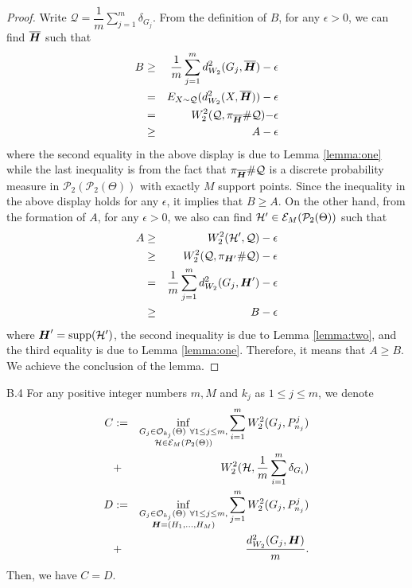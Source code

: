 \begin{proof}
Write $\mathcal{Q}=\dfrac{1}{m}\mathop {\sum }\limits_{j=1}^{m}{\delta_{G_{j}}}$. From the definition of $B$, for any $\epsilon>0$, we can find $\overline{\boldsymbol{H}}$ such that 
\begin{eqnarray}
B & \geq & \dfrac{1}{m}\sum \limits_{j=1}^{m} d_{W_{2}}^{2}(G_{j},\overline{\boldsymbol{H}}) - \epsilon \nonumber \\
& = & E_{X \sim \mathcal{Q}}(d_{W_{2}}^{2}(X,\overline{\boldsymbol{H}})) - \epsilon \nonumber \\
& = & W_{2}^{2}(\mathcal{Q},\pi_{\overline{\boldsymbol{H}}} \# \mathcal{Q}) {\bf - \epsilon} \nonumber \\
& \geq & A -\epsilon \nonumber
\end{eqnarray}
where the second equality in the above display
is due to Lemma \ref{lemma:one} while the last 
inequality is from the fact that $\pi_{\overline{\boldsymbol{H}}} \# \mathcal{Q}$ is a discrete probability measure in $\mathcal{P}_{2}(\mathcal{P}_{2}(\Theta))$ with exactly $M$ support points. Since the inequality in the above display holds for any $\epsilon$, it implies that $B \geq A$. On the other hand, from the formation of $A$, for any $\epsilon>0$, we also can find $\mathcal{H}' \in \mathcal{E}_{M}(\mathcal{P}_{2}(\Theta))$ such that
\begin{eqnarray}
A & \geq & W_{2}^{2}(\mathcal{H}',\mathcal{Q}) - \epsilon \nonumber \\
& \geq & W_{2}^{2}(\mathcal{Q},\pi_{\boldsymbol{H}'} \# \mathcal{Q}) - \epsilon \nonumber \\
& = & \dfrac{1}{m}\sum \limits_{j=1}^{m} d_{W_{2}}^{2}(G_{j},\boldsymbol{H}') -\epsilon \nonumber \\
& \geq & B - \epsilon \nonumber
\end{eqnarray}
where  $\boldsymbol{H}' = \text{supp}(\mathcal{H}')$, the second inequality is due to Lemma \ref{lemma:two}, and the third equality is due to Lemma \ref{lemma:one}. Therefore, it means that $A \geq B$. We achieve the conclusion of the lemma. 
\end{proof}
\begin{customprop}{B.4} \label{lemma:equivalence_multilevels_Kmeans}
For any positive integer numbers $m, M$ and $k_{j}$ as $1 \leq j \leq m$, we denote 
\begin{eqnarray}
C & : = & \mathop {\inf }\limits_{\substack {G_{j} \in \mathcal{O}_{k_{j}}(\Theta) \ \forall 1 \leq j \leq m, \\ \mathcal{H} \in \mathcal{E}_{M}(\mathcal{P}_{2}(\Theta))}}{\mathop {\sum }\limits_{i=1}^{m}{W_{2}^{2}(G_{j},P_{n_{j}}^{j})}} \nonumber \\
& + & W_{2}^{2}(\mathcal{H},\dfrac{1}{m}\mathop {\sum }\limits_{i=1}^{m}{\delta_{G_{i}}}) \nonumber \\
D & : = & \mathop {\inf }\limits_{\substack {G_{j} \in \mathcal{O}_{k_{j}}(\Theta) \ \forall 1 \leq j \leq m, \\ \boldsymbol{H} = (H_{1},\ldots,H_{M})}}{\mathop {\sum }\limits_{j=1}^{m}{W_{2}^{2}(G_{j},P_{n_{j}}^{j})}} \nonumber \\
& + & \dfrac{d_{W_{2}}^{2}(G_{j},\boldsymbol{H})}{m}. \nonumber
\end{eqnarray}
Then, we have $C = D$.
\end{customprop}
